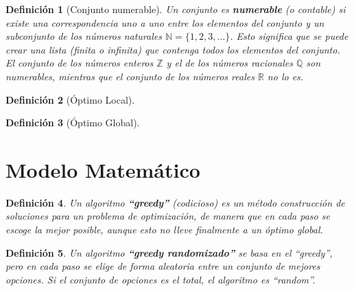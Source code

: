 \documentclass[12pt,a4paper]{book}
\newtheorem{defi}{Definición}[section]
\begin{document}
\begin{defi}[Conjunto numerable]
Un conjunto es \textbf{numerable} (o contable) si existe una correspondencia uno a uno entre los elementos del conjunto y un subconjunto de los números naturales $\mathbb{N} = \{1, 2, 3, \dots\}$. Esto significa que se puede crear una lista (finita o infinita) que contenga todos los elementos del conjunto. El conjunto de los números enteros $\mathbb{Z}$ y el de los números racionales $\mathbb{Q}$ son numerables, mientras que el conjunto de los números reales $\mathbb{R}$ no lo es.
\end{defi}

\begin{defi}[Óptimo Local]

\end{defi}

\begin{defi}[Óptimo Global]

\end{defi}

\section{Modelo Matemático}

\begin{defi}
Un algoritmo \textbf{``greedy''} (codicioso) es un método construcción de soluciones para un problema de optimización,
de manera que en cada paso se escoge la mejor posible, aunque esto no lleve finalmente a un óptimo global.
\end{defi}

\bigskip

\begin{defi}
Un algoritmo \textbf{``greedy randomizado''} se basa en el ``greedy'', pero en cada paso se elige de forma aleatoria entre un conjunto de mejores opciones.
Si el conjunto de opciones es el total, el algoritmo es ``random''.
\end{defi}

\nocite{*}


\end{document}
